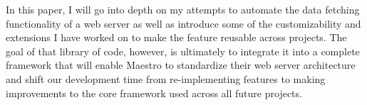 In this paper, I will go into depth on my attempts to automate the data fetching functionality of a web server as well as introduce some of the customizability and extensions I have worked on to make the feature reusable across projects.  The goal of that library of code, however, is ultimately to integrate it into a complete framework that will enable Maestro to standardize their web server architecture and shift our development time from re-implementing features to making improvements to the core framework used across all future projects. 